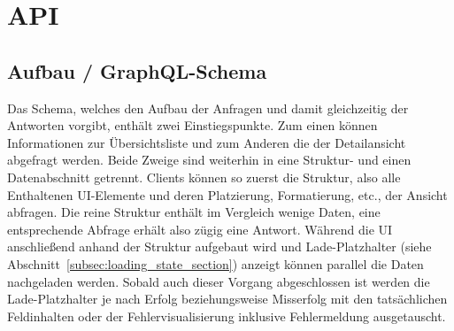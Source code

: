 \section{API}

\subsection{Aufbau / GraphQL-Schema}\label{subsec:grapql_schema}
Das Schema, welches den Aufbau der Anfragen und damit gleichzeitig der Antworten vorgibt, enthält zwei Einstiegspunkte. Zum einen können Informationen zur Übersichtsliste und zum Anderen die der Detailansicht abgefragt werden. Beide Zweige sind weiterhin in eine Struktur- und einen Datenabschnitt getrennt. Clients können so zuerst die Struktur, also alle Enthaltenen UI-Elemente und deren Platzierung, Formatierung, etc., der Ansicht abfragen. Die reine Struktur enthält im Vergleich wenige Daten, eine entsprechende Abfrage erhält also zügig eine Antwort. Während die UI anschließend anhand der Struktur aufgebaut wird und Lade-Platzhalter (siehe Abschnitt~\ref{subsec:loading_state_section}) anzeigt können parallel die Daten nachgeladen werden. Sobald auch dieser Vorgang abgeschlossen ist werden die Lade-Platzhalter je nach Erfolg beziehungsweise Misserfolg mit den tatsächlichen Feldinhalten oder der Fehlervisualisierung inklusive Fehlermeldung ausgetauscht.

